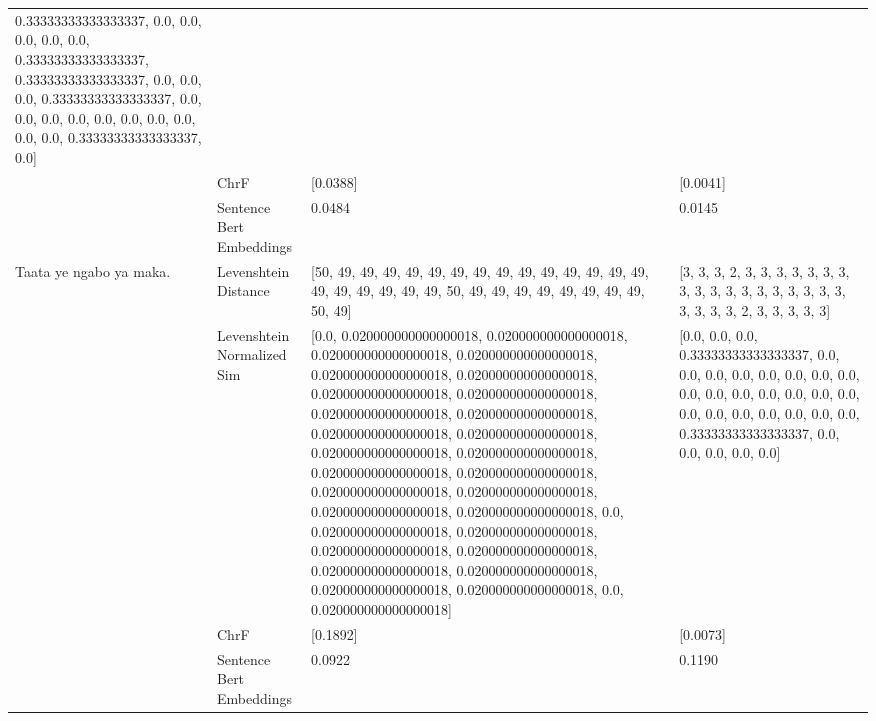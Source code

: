 \begin{tabular}{llll}
0.33333333333333337, 0.0, 0.0, 0.0, 0.0, 0.0, 0.33333333333333337, 0.33333333333333337, 0.0, 0.0, 0.0, 0.33333333333333337, 0.0, 0.0, 0.0, 0.0, 0.0, 0.0, 0.0, 0.0, 0.0, 0.0, 0.33333333333333337, 0.0] \\
 & ChrF & [0.0388] & [0.0041] \\
 & Sentence Bert Embeddings & 0.0484 & 0.0145 \\
\cline{1-4}
\multirow[t]{4}{*}{Taata ye ngabo ya maka.} & Levenshtein Distance & [50, 49, 49, 49, 49, 49, 49, 49, 49, 49, 49, 49, 49, 49, 49, 49, 49, 49, 49, 49, 49, 50, 49, 49, 49, 49, 49, 49, 49, 49, 50, 49] & [3, 3, 3, 2, 3, 3, 3, 3, 3, 3, 3, 3, 3, 3, 3, 3, 3, 3, 3, 3, 3, 3, 3, 3, 3, 3, 2, 3, 3, 3, 3, 3] \\
 & Levenshtein Normalized Sim & [0.0, 0.020000000000000018, 0.020000000000000018, 0.020000000000000018, 0.020000000000000018, 0.020000000000000018, 0.020000000000000018, 0.020000000000000018, 0.020000000000000018, 0.020000000000000018, 0.020000000000000018, 0.020000000000000018, 0.020000000000000018, 0.020000000000000018, 0.020000000000000018, 0.020000000000000018, 0.020000000000000018, 0.020000000000000018, 0.020000000000000018, 0.020000000000000018, 0.020000000000000018, 0.0, 0.020000000000000018, 0.020000000000000018, 0.020000000000000018, 0.020000000000000018, 0.020000000000000018, 0.020000000000000018, 0.020000000000000018, 0.020000000000000018, 0.0, 0.020000000000000018] & [0.0, 0.0, 0.0, 0.33333333333333337, 0.0, 0.0, 0.0, 0.0, 0.0, 0.0, 0.0, 0.0, 0.0, 0.0, 0.0, 0.0, 0.0, 0.0, 0.0, 0.0, 0.0, 0.0, 0.0, 0.0, 0.0, 0.0, 0.33333333333333337, 0.0, 0.0, 0.0, 0.0, 0.0] \\
 & ChrF & [0.1892] & [0.0073] \\
 & Sentence Bert Embeddings & 0.0922 & 0.1190 \\
\cline{1-4}
\bottomrule
\end{tabular}
